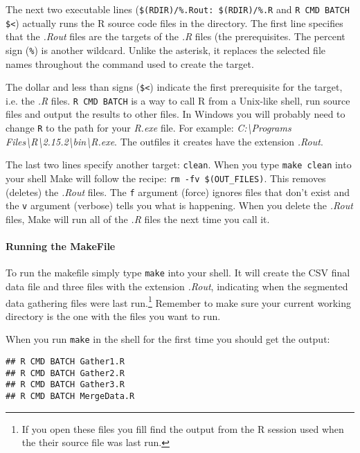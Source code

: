 The next two executable lines (\verb|$(RDIR)/%.Rout: $(RDIR)/%.R| and \verb|R CMD BATCH $<|) actually runs the R source code files in the directory.  The first line specifies that the \emph{.Rout} files are the targets of the \emph{.R} files (the prerequisites. The percent sign (\verb|%|) is another wildcard. Unlike the asterisk, it replaces the selected file names throughout the command used to create the target.

The dollar and less than signs (\verb|$<|) indicate the first prerequisite for the target, i.e. the \emph{.R} files. \texttt{R CMD BATCH} is a way to call R from a Unix-like shell, run source files and output the results to other files. In Windows you will probably need to change \texttt{R} to the path for your \emph{R.exe} file. For example: \emph{C:\textbackslash{}Programs Files\textbackslash{}R\textbackslash{}2.15.2\textbackslash{}bin\textbackslash{}R.exe}. The outfiles it creates have the extension \emph{.Rout}.

The last two lines specify another target: \texttt{clean}. When you type \texttt{make clean} into your shell Make will follow the recipe: \verb|rm -fv $(OUT_FILES)|. This removes (deletes) the \emph{.Rout} files. The \texttt{f} argument (force) ignores  files that don't exist and the \texttt{v} argument (verbose) tells you what is happening. When you delete the \emph{.Rout} files, Make will run all of the \emph{.R} files the next time you call it.

\paragraph{Running the MakeFile}

To run the makefile simply type \texttt{make} into your shell. It will create the CSV final data file and three files with the extension \emph{.Rout}, indicating when the segmented data gathering files were last run.\footnote{If you open these files you fill find the output from the R session used when the their source file was last run.} Remember to make sure your current working directory is the one with the files you want to run. 

When you run \verb|make| in the shell for the first time you should get the output:

\begin{knitrout}
	\color{fgcolor}
	\begin{kframe}
		\begin{verbatim}
## R CMD BATCH Gather1.R
## R CMD BATCH Gather2.R
## R CMD BATCH Gather3.R
## R CMD BATCH MergeData.R
			\end{verbatim}
		\end{kframe}
\end{knitrout}

